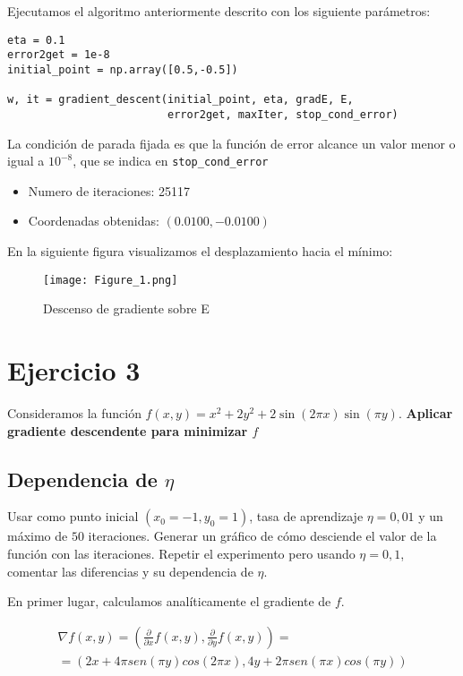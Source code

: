 Ejecutamos el algoritmo anteriormente descrito con los siguiente parámetros:

\begin{verbatim}
eta = 0.1 
error2get = 1e-8
initial_point = np.array([0.5,-0.5])

w, it = gradient_descent(initial_point, eta, gradE, E, 
                         error2get, maxIter, stop_cond_error)
\end{verbatim}

La condición de parada fijada es que la función de error alcance un valor
menor o igual a $10^{-8}$, que se indica en \texttt{stop_cond_error}

\begin{itemize}
\item Numero de iteraciones: 25117
\item Coordenadas obtenidas: $(0.0100 ,  -0.0100)$
\end{itemize}


En la siguiente figura visualizamos el desplazamiento hacia el mínimo: 

\begin{figure}[H]
\centering
\texttt{[image: Figure\_1.png]}
\caption{Descenso de gradiente sobre E}
\end{figure}

\section{Ejercicio 3}

Consideramos la función  $f(x,y) = x^2 + 2y^2 + 2 \sin (2 \pi x) \sin (\pi y)$.
\textbf{Aplicar gradiente descendente para minimizar $f$}

\subsection{Dependencia de $\eta$}

Usar como punto inicial $(x_0 = -1, y_0 = 1)$, tasa de aprendizaje $\eta = 0,01$
y un máximo de $50$ iteraciones. Generar un gráfico de cómo desciende el valor
de la función con las iteraciones. Repetir el experimento pero usando 
$\eta =0,1$, comentar las diferencias y su dependencia de $\eta$.  

En primer lugar, calculamos analíticamente el gradiente de $f$.

\begin{equation*}
\begin{aligned}
  \nabla f(x,y) = \left(\frac{\partial }{\partial x} f(x,y),  \frac{\partial }{\partial y} f(x,y)  \right) = \\
=  \left( 2x + 4\pi sen(\pi y)cos(2\pi x),   4y + 2\pi sen(\pi x)cos(\pi y)  \right)
\end{aligned}
\end{equation*}

